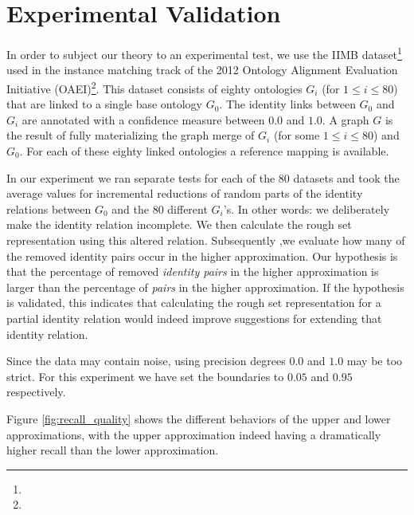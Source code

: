 \section{Experimental Validation}
\label{sec:experiment}
\label{sec:experimental_design}
\label{sec:experimental_validation}

In order to subject our theory to an experimental test,
  we use the IIMB dataset\footnote{}
  used in the instance matching track of the
  2012 Ontology Alignment Evaluation Initiative
  (OAEI)\footnote{}.
This dataset consists of eighty ontologies $G_i$ (for $1 \leq i \leq 80$)
  that are linked to a single base ontology $G_0$.
The identity links between $G_0$ and $G_i$ are annotated with a
  confidence measure between $0.0$ and $1.0$.
A graph $G$ is the result of fully materializing the graph merge
  of $G_i$ (for some $1 \leq i \leq 80$) and $G_0$.
For each of these eighty linked ontologies a reference mapping is available.

In our experiment we ran separate tests for each of the $80$ datasets
  and took the average values for incremental reductions of
  random parts of the identity relations between $G_0$ and the $80$
  different $G_i$'s.
In other words: we deliberately make the identity relation incomplete.
We then calculate the rough set representation using this altered relation.
Subsequently ,we evaluate how many of the removed identity pairs occur in
  the higher approximation.
Our hypothesis is that the percentage of removed \emph{identity pairs}
  in the higher approximation is larger than the percentage of \emph{pairs}
  in the higher approximation.
If the hypothesis is validated, this indicates that
  calculating the rough set representation for a partial identity relation
  would indeed improve suggestions for extending that identity relation.

Since the data may contain noise, using precision degrees $0.0$ and $1.0$
  may be too strict. For this experiment we have set the boundaries
  to $0.05$ and $0.95$ respectively.

Figure \ref{fig:recall_quality} shows the different behaviors of the
  upper and lower approximations, with the upper approximation indeed
  having a dramatically higher recall than the lower approximation.

